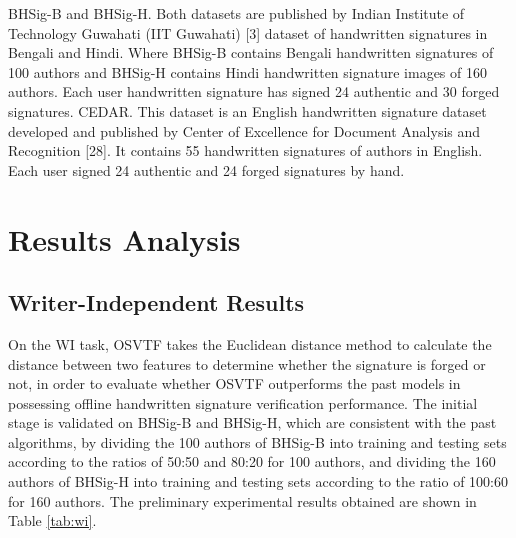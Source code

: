 BHSig-B and BHSig-H. Both datasets are published by Indian Institute of Technology Guwahati (IIT Guwahati) [3] dataset of handwritten signatures in Bengali and Hindi. Where BHSig-B contains Bengali handwritten signatures of 100 authors and BHSig-H contains Hindi handwritten signature images of 160 authors. Each user handwritten signature has signed 24 authentic and 30 forged signatures.
CEDAR. This dataset is an English handwritten signature dataset developed and published by Center of Excellence for Document Analysis and Recognition [28]. It contains 55 handwritten signatures of authors in English. Each user signed 24 authentic and 24 forged signatures by hand.

\section{Results Analysis}

\subsection{Writer-Independent Results}

On the WI task, OSVTF takes the Euclidean distance method to calculate the distance between two features to determine whether the signature is forged or not, in order to evaluate whether OSVTF outperforms the past models in possessing offline handwritten signature verification performance. The initial stage is validated on BHSig-B and BHSig-H, which are consistent with the past algorithms, by dividing the 100 authors of BHSig-B into training and testing sets according to the ratios of 50:50 and 80:20 for 100 authors, and dividing the 160 authors of BHSig-H into training and testing sets according to the ratio of 100:60 for 160 authors. The preliminary experimental results obtained are shown in Table \ref{tab:wi}.

